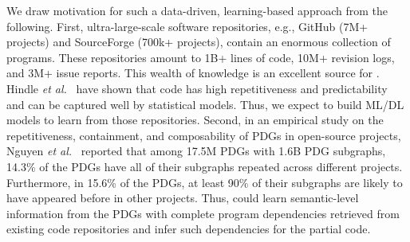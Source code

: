 We draw motivation for such a data-driven, learning-based approach
from the following. First, ultra-large-scale software repositories,
e.g., GitHub (7M+ projects) and SourceForge (700k+ projects), contain
an enormous collection of programs. These repositories amount to 1B+
lines of code, 10M+ revision logs, and 3M+ issue reports. This wealth
of knowledge is an excellent source for {\tool}. Hindle {\em et
  al.}~\cite{naturalness-icse12} have shown that code has high
repetitiveness and predictability and can be captured well by
statistical models. Thus, we expect to build ML/DL models to learn
from those repositories.
Second, in an empirical study on the repetitiveness, containment, and
composability of PDGs in open-source projects, Nguyen {\em et
  al.}~\cite{msr16} reported that among 17.5M PDGs with 1.6B PDG
subgraphs, 14.3\% of the PDGs have all of their subgraphs repeated
across different projects. Furthermore, in 15.6\% of the PDGs, at
least 90\% of their subgraphs are likely to have appeared before in
other projects.
Thus, {\tool} could learn semantic-level information from the PDGs
with complete program dependencies retrieved from existing code
repositories and infer such dependencies for the partial code.


